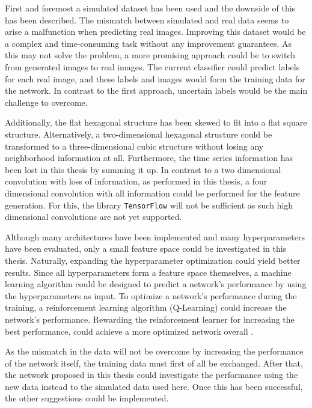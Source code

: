 First and foremost a simulated dataset has been used and the downside of this has been described.
The mismatch between simulated and real data seems to arise a malfunction when predicting real images.
Improving this dataset would be a complex and time-consuming task without any improvement guarantees.
As this may not solve the problem,
a more promising approach could be to switch from generated images to real images.
The current classifier could predict labels for each real image, and these labels
and images would form the training data for the network.
In contrast to the first approach, uncertain labels would be the main challenge to overcome.

Additionally, the flat hexagonal structure has been skewed to fit into a flat square structure.
Alternatively, a two-dimensional hexagonal structure could be transformed to a three-dimensional cubic structure
without losing any neighborhood information at all.
Furthermore, the time series information has been lost in this thesis by summing it up.
In contrast to a two dimensional convolution with loss of information, as performed in this thesis,
a four dimensional convolution with all information could be performed for the feature generation.
For this, the library \texttt{TensorFlow} will not be sufficient as such high dimensional convolutions are not yet supported.

Although many architectures have been implemented and many hyperparameters have been evaluated,
only a small feature space could be investigated in this thesis.
Naturally, expanding the hyperparameter optimization could yield better results.
Since all hyperparameters form a feature space themselves, a machine learning algorithm could be designed to predict
a network's performance by using the hyperparameters as input.
To optimize a network's performance during the training,
a reinforcement learning algorithm (Q-Learning) could increase the network's performance.
Rewarding the reinforcement learner for increasing the best performance,
could achieve a more optimized network overall \cite{q_learning}.

As the mismatch in the data will not be overcome by increasing the performance of the network itself,
the training data must first of all be exchanged.
After that, the network proposed in this thesis could investigate the performance using the new data
instead to the simulated data used here.
Once this has been successful, the other suggestions could be implemented.


